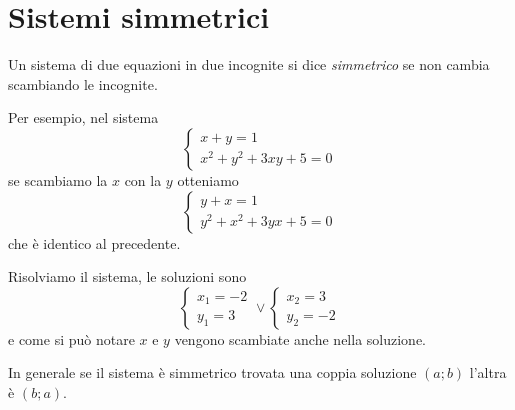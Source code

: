 % 
% 

\section{Sistemi simmetrici}
\label{sec:eq2gr_sistemi_simmetrici}

Un sistema di due equazioni in due incognite si dice \emph{simmetrico} se non 
cambia scambiando le incognite.

Per esempio, nel sistema 
\[\left\{\begin{array}{l}{x+y=1}\\{x^2+y^2+3{xy}+5=0}\end{array}\right.\] se 
scambiamo la \(x\) con la \(y\) otteniamo 
\[\left\{\begin{array}{l}{y+x=1}\\{y^2+x^2+3{yx}+5=0}\end{array}\right.\] che è 
identico al precedente.

Risolviamo il sistema, le soluzioni sono 
\[\left\{\begin{array}{l}{x_1=-2}\\{y_1=3}\end{array}\right.\vee 
\left\{\begin{array}{l}{x_2=3}\\{y_2=-2}\end{array}\right.\] 
e come si può notare \(x\) e \(y\) vengono scambiate anche nella soluzione.

In generale se il sistema è simmetrico trovata una coppia soluzione \((a;b)\) 
l'altra è \((b;a)\).

